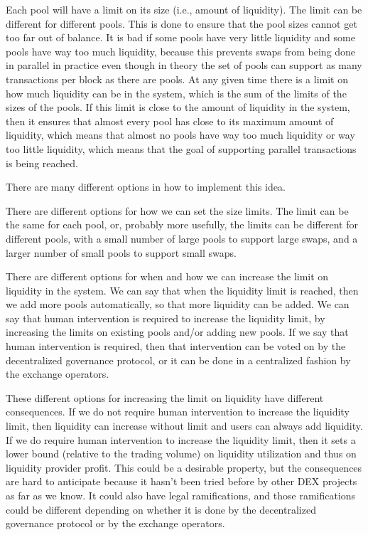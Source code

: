 \documentclass[12pt]{article}
\begin{document}
Each pool will have a limit on its size (i.e., amount of liquidity). The limit can be different for different pools.
This is done to ensure that the pool sizes cannot get too far out of
balance. It is bad if some pools have very little liquidity and some pools have way too much liquidity,
because this prevents swaps from being done in parallel in practice even though in theory the set of
pools can support as many transactions per block as there are pools. At any given time there is a limit
on how much liquidity can be in the system, which is the sum of the limits of the sizes of the pools.
If this limit is close to the amount of liquidity in the system, then it ensures that almost every pool has
close to its maximum amount of liquidity, which means that almost no pools have way too much liquidity
or way too little liquidity, which means that the goal of supporting parallel transactions is being reached.

There are many different options in how to implement this idea.

There are different options for how we can set the
size limits. The limit can be the same for each pool, or, probably more usefully, the limits can be different
for different pools, with a small number of large pools to support large swaps, and a larger number of small
pools to support small swaps.

There are different options for when and how we can increase the limit on liquidity in the system. We can say
that when the liquidity limit is reached, then we add more pools automatically, so that more liquidity
can be added. We can say that human intervention is required to increase the liquidity limit, by increasing
the limits on existing pools and/or adding new pools. If we say that human intervention is required, then
that intervention can be voted on by the decentralized governance protocol, or it can be done in a centralized
fashion by the exchange operators.

These different options for increasing the limit on liquidity have different consequences. If we do not require
human intervention to increase the liquidity limit, then liquidity can increase without limit and users can
always add liquidity. If we do require human intervention to increase the liquidity limit, then it sets a lower
bound (relative to the trading volume) on liquidity utilization and thus on liquidity provider profit.
This could be a desirable property, but the consequences are hard to anticipate because it hasn't been
tried before by other DEX projects as far as we know. It could also have legal ramifications, and those
ramifications could be different depending on whether it is done by the decentralized governance protocol
or by the exchange operators.
\end{document}
